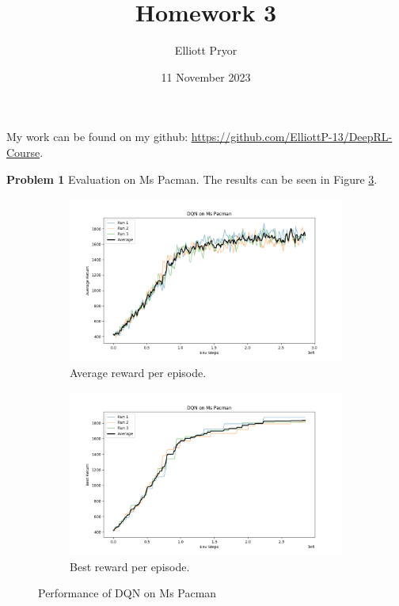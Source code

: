\documentclass[11pt]{article}
\title{Homework 3}
\author{Elliott Pryor}
\date{11 November 2023}
\begin{document}
\maketitle

My work can be found on my github:
\href{https://github.com/ElliottP-13/DeepRL-Course/tree/main/hw1}{https://github.com/ElliottP-13/DeepRL-Course}.

\large{\textbf{Problem 1}}
Evaluation on Ms Pacman. The results can be seen in Figure \ref{fig:q1}.

\begin{figure}[h]
    \centering
    \begin{subfigure}{.75\textwidth}
        \centering
        \includegraphics[width=.95 \linewidth]{hw3_q1.png}
        \caption{Average reward per episode.}
        \label{fig:}
    \end{subfigure}
    \begin{subfigure}{.75\textwidth}
        \centering
        \includegraphics[width=.95 \linewidth]{hw3_q1_best.png}
        \caption{Best reward per episode.}
        \label{fig:}
    \end{subfigure}
    \caption{Performance of DQN on Ms Pacman}
    \label{fig:q1}
\end{figure}
\end{document}
